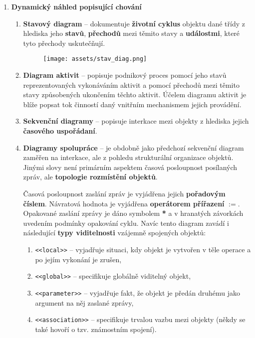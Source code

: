 \begin{enumerate}
\item \textbf{Dynamický náhled popisující chování}
\begin{enumerate}
\item \textbf{Stavový diagram} -- dokumentuje \textbf{životní cyklus} objektu dané třídy z hlediska jeho \textbf{stavů}, \textbf{přechodů} mezi těmito stavy a \textbf{událostmi}, které tyto přechody uskutečňují. 
\begin{figure}[H]
	\centering
	\texttt{[image: assets/stav\_diag.png]}
\end{figure}
\item \textbf{Diagram aktivit} --  popisuje podnikový proces pomocí jeho stavů reprezentovaných vykonáváním aktivit a pomocí přechodů mezi těmito stavy způsobených ukončením těchto aktivit. Účelem diagramu aktivit je blíže popsat tok činností daný vnitřním mechanismem jejich provádění. 
\item \textbf{Sekvenční diagramy} -- popisuje interkace mezi objekty z hlediska jejich \textbf{časového uspořádaní}.
\item \textbf{Diagramy spolupráce} -- je obdobně jako předchozí sekvenční diagram zaměřen na interkace, ale z pohledu strukturální organizace objektů. Jinými slovy není primárním aspektem časová posloupnost posílaných zpráv, ale \textbf{topologie rozmístění objektů}.

Časová posloupnost zaslání zpráv je vyjádřena jejich \textbf{pořadovým číslem}. Návratová hodnota je vyjádřena \textbf{operátorem přířazení} \textbf{$:=$}. Opakované zaslání zprávy je dáno symbolem \textbf{*} a v hranatých závorkách uvedením podmínky opakování cyklu. Navíc tento diagram zavádí i následující \textbf{typy viditelnosti} vzájemně spojených objektů: 
\begin{enumerate}
\item \texttt{<<local>>} -- vyjadřuje situaci, kdy objekt je vytvořen v těle operace a po jejím vykonání je zrušen, 
\item \texttt{<<global>>} -- specifikuje globálně viditelný objekt,
\item \texttt{<<parameter>>} -- vyjadřuje fakt, že objekt je předán druhému jako argument na něj zaslané zprávy,
\item \texttt{<<association>>} -- specifikuje trvalou vazbu mezi objekty (někdy se také hovoří o tzv. známostním spojení).
\end{enumerate}


\end{enumerate}
\end{enumerate}
